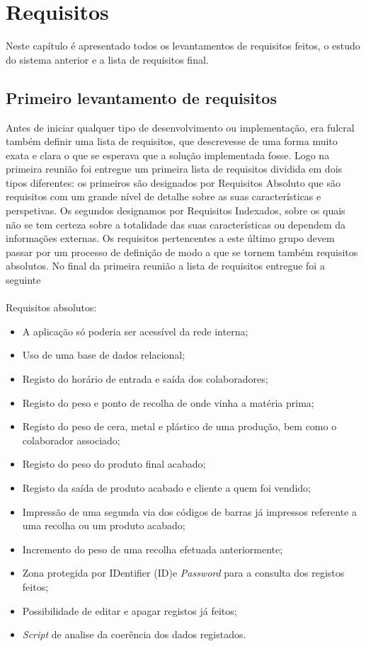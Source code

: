 \chapter{Requisitos} 
\label{cap:3}
Neste capítulo é apresentado todos os levantamentos de requisitos feitos, o estudo do sistema anterior e a lista de requisitos final.

\section{Primeiro levantamento de requisitos}
Antes de iniciar qualquer tipo de desenvolvimento ou implementação, era fulcral também definir uma lista de requisitos, que descrevesse de uma forma muito exata e clara o que se esperava que a solução implementada fosse. Logo na primeira reunião foi entregue um primeira lista de requisitos dividida em dois tipos diferentes: os primeiros são designados por Requisitos Absoluto que são requisitos com um grande nível de detalhe sobre as suas características e perspetivas. Os segundos designamos por Requisitos Indexados, sobre os quais não se tem certeza sobre a totalidade das suas características ou dependem da informações externas. Os requisitos pertencentes a este último grupo devem passar por um processo de definição de modo a que se tornem também requisitos absolutos.
No final da primeira reunião a lista de requisitos entregue foi a seguinte\\
\\
Requisitos absolutos:
\begin{itemize}
	\item A aplicação só poderia ser acessível da rede interna;
	\item Uso de uma base de dados relacional;
	\item Registo do horário de entrada e saída dos colaboradores;
	\item Registo do peso e ponto de recolha de onde vinha a matéria prima;
	\item Registo do peso de cera, metal e plástico de uma produção, bem como o colaborador associado;
	\item Registo do peso do produto final acabado;
	\item Registo da saída de produto acabado e cliente a quem foi vendido;
	\item Impressão de uma segunda via dos códigos de barras já impressos referente a uma recolha ou um produto acabado;
	\item Incremento do peso de uma recolha efetuada anteriormente;
	\item Zona protegida por IDentifier (ID\label{sym:ID})e \textit{Password} para a consulta dos registos feitos;
	\item Possibilidade de editar e apagar registos já feitos;
	\item \textit{Script} de analise da coerência dos dados registados.
\end{itemize}
